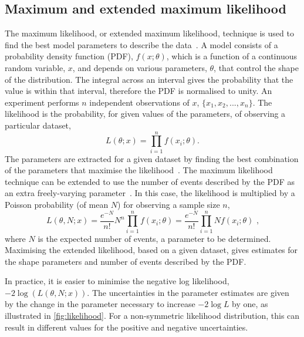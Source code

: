 \subsection{Maximum and extended maximum likelihood}
\label{sec:massfit:likelihood}

The maximum likelihood, or extended maximum likelihood, technique is used to find the best model parameters to describe the data~\cite{MLandEML,EML}. A model consists of a probability density function (PDF), $f(x;\theta)$, which is a function of a continuous random variable, $x$, and depends on various parameters, $\theta$, that control the shape of the distribution. The integral across an interval gives the probability that the value is within that interval, therefore the PDF is normalised to unity. An experiment performs $n$ independent observations of $x$, $\{x_1, x_2, ..., x_n\}$. The likelihood is the probability, for given values of the parameters, of observing a particular dataset,
\begin{equation}
L(\theta;x) = \prod_{i=1}^{n} f(x_i;\theta).
\end{equation}
The parameters are extracted for a given dataset by finding the best combination of the parameters that maximise the likelihood~\cite{MLandEML}. The maximum likelihood technique can be extended to use the number of events described by the PDF as an extra freely-varying parameter~\cite{EML}. In this case, the likelihood is multiplied by a Poisson probability (of mean $N$) for observing a sample size $n$,
\begin{equation}
L(\theta, N;x) = \frac{e^{-N}}{n!}N^n \prod_{i=1}^{n} f(x_i;\theta) = \frac{e^{-N}}{n!} \prod_{i=1}^{n} N f(x_i;\theta) \text{ ,}
\end{equation}
where $N$ is the expected number of events, a parameter to be determined. Maximising the extended likelihood, based on a given dataset, gives estimates for the shape parameters and number of events described by the PDF.

In practice, it is easier to minimise the negative log likelihood, $-2\log(L(\theta, N;x))$. The uncertainties in the parameter estimates are given by the change in the parameter necessary to increase $-2\log L$ by one, as illustrated in \fig\ref{fig:likelihood}. For a non-symmetric likelihood distribution, this can result in different values for the positive and negative uncertainties. 

